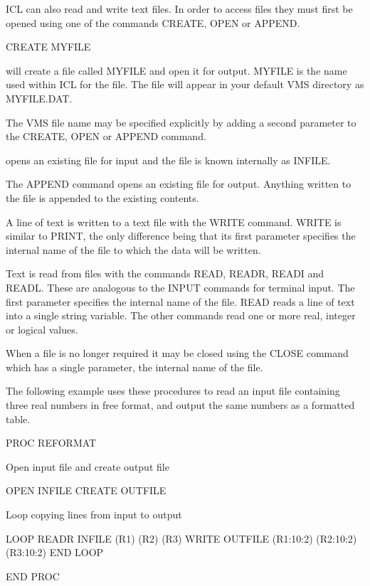 \documentclass[twoside,11pt,nolof,chapters]{starlink}
\begin{document}
ICL can also read and write text files. In order to access files they must
first be opened using one of the commands CREATE, OPEN or APPEND.
\begin{terminalv}

    CREATE MYFILE

\end{terminalv}
will create a file called MYFILE and open it for output. MYFILE is the name
used within ICL for the file. The file will appear in your default VMS
directory as MYFILE.DAT.

The VMS file name may be specified explicitly by adding a second parameter
to the CREATE, OPEN or APPEND command.
opens an existing file for input and the file is known internally as INFILE.

The APPEND command opens an existing file for output. Anything written to
the file is appended to the existing contents.

A line of text is written to a text file with the WRITE command. WRITE
is similar to PRINT, the only difference being that its first parameter
specifies the internal name of the file to which the data will be written.

Text is read from files with the commands READ, READR, READI and READL.
These are analogous to the INPUT commands for terminal input. The first
parameter specifies the internal name of the file. READ reads a line of
text into a single string variable. The other commands read one or more
real, integer or logical values.

When a file is no longer required it may be closed using the CLOSE command
which has a single parameter, the internal name of the file.

The following example uses these procedures to read an input file containing
three real numbers in free format, and output the same numbers as a formatted
table.

\begin{terminalv}
    PROC REFORMAT

    {  Open input file and create output file  }

        OPEN INFILE
        CREATE OUTFILE

    {  Loop copying lines from input to output  }

        LOOP
           READR INFILE (R1) (R2) (R3)
           WRITE OUTFILE (R1:10:2) (R2:10:2) (R3:10:2)
        END LOOP

    END PROC

\end{terminalv}
\end{document}

